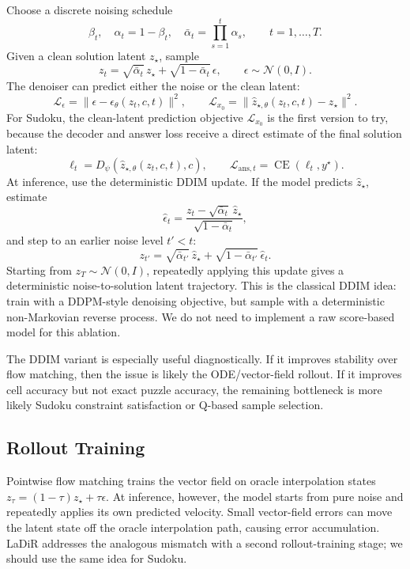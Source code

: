 \documentclass[11pt]{article}
\begin{document}
Choose a discrete noising schedule
\[
    \beta_t,\quad
    \alpha_t=1-\beta_t,\quad
    \bar\alpha_t=\prod_{s=1}^{t}\alpha_s,
    \qquad t=1,\dots,T.
\]
Given a clean solution latent \(z_\star\), sample
\[
    z_t
    =
    \sqrt{\bar\alpha_t}\,z_\star
    +
    \sqrt{1-\bar\alpha_t}\,\epsilon,
    \qquad
    \epsilon\sim\mathcal N(0,I).
\]
The denoiser can predict either the noise or the clean latent:
\[
    \mathcal L_{\epsilon}
    =
    \|\epsilon-\epsilon_\theta(z_t,c,t)\|^2,
    \qquad
    \mathcal L_{x_0}
    =
    \|\hat z_{\star,\theta}(z_t,c,t)-z_\star\|^2.
\]
For Sudoku, the clean-latent prediction objective \(\mathcal L_{x_0}\) is the first version to try, because the decoder and answer loss receive a direct estimate of the final solution latent:
\[
    \ell_t
    =
    D_\psi(\hat z_{\star,\theta}(z_t,c,t),c),
    \qquad
    \mathcal L_{\mathrm{ans},t}
    =
    \operatorname{CE}(\ell_t,y^\star).
\]
At inference, use the deterministic DDIM update. If the model predicts \(\hat z_\star\), estimate
\[
    \hat\epsilon_t
    =
    \frac{
        z_t-\sqrt{\bar\alpha_t}\,\hat z_\star
    }{
        \sqrt{1-\bar\alpha_t}
    },
\]
and step to an earlier noise level \(t'<t\):
\[
    z_{t'}
    =
    \sqrt{\bar\alpha_{t'}}\,\hat z_\star
    +
    \sqrt{1-\bar\alpha_{t'}}\,\hat\epsilon_t.
\]
Starting from \(z_T\sim\mathcal N(0,I)\), repeatedly applying this update gives a deterministic noise-to-solution latent trajectory. This is the classical DDIM idea: train with a DDPM-style denoising objective, but sample with a deterministic non-Markovian reverse process. We do not need to implement a raw score-based model for this ablation.

The DDIM variant is especially useful diagnostically. If it improves stability over flow matching, then the issue is likely the ODE/vector-field rollout. If it improves cell accuracy but not exact puzzle accuracy, the remaining bottleneck is more likely Sudoku constraint satisfaction or Q-based sample selection.

\subsection{Rollout Training}

Pointwise flow matching trains the vector field on oracle interpolation states \(z_\tau=(1-\tau)z_\star+\tau\epsilon\). At inference, however, the model starts from pure noise and repeatedly applies its own predicted velocity. Small vector-field errors can move the latent state off the oracle interpolation path, causing error accumulation. LaDiR addresses the analogous mismatch with a second rollout-training stage; we should use the same idea for Sudoku.
\end{document}
